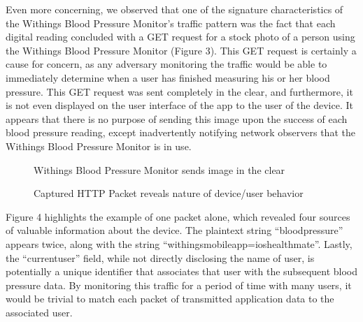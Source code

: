 Even more concerning, we observed that one of the signature characteristics of the Withings Blood Pressure Monitor's traffic pattern was the fact that each digital reading concluded with a GET request for a stock photo of a person using the Withings Blood Pressure Monitor (Figure 3). This GET request is certainly a cause for concern, as any adversary monitoring the traffic would be able to immediately determine when a user has finished measuring his or her blood pressure. This GET request was sent completely in the clear, and furthermore, it is not even displayed on the user interface of the app to the user of the device. It appears that there is no purpose of sending this image upon the success of each blood pressure reading, except inadvertently notifying network observers that the Withings Blood Pressure Monitor is in use. 

\begin{figure}
  \caption{Withings Blood Pressure Monitor sends image in the clear}
  \centering
\end{figure}

\begin{figure}
  \caption{Captured HTTP Packet reveals nature of device/user behavior}
  \centering
\end{figure}

Figure 4 highlights the example of one packet alone, which revealed four sources of valuable information about the device. The plaintext string ``blood\textunderscore pressure'' appears twice, along with the string ``withings\textunderscore mobile\textunderscore app=ios\textunderscore healthmate''. Lastly, the ``current\textunderscore user'' field, while not directly disclosing the name of user, is potentially a unique identifier that associates that user with the subsequent blood pressure data. By monitoring this traffic for a period of time with many users, it would be trivial to match each packet of transmitted application data to the associated user. 

